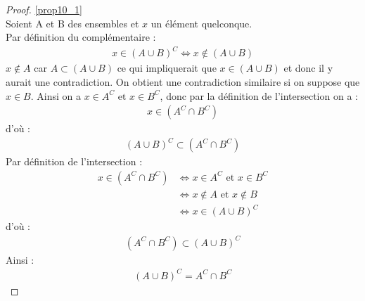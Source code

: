 \begin{proof}
	\ref{prop10_1} \\
	Soient A et B des ensembles et $x$ un élément quelconque.
	\\
	\framebox{$\subset$}
	Par définition du complémentaire : 
	\begin{align*}
		x \in (A \cup B)^C \iff x \notin (A \cup B)
	\end{align*}
	$x \notin A$ car $A \subset (A \cup B)$ ce qui impliquerait que $x \in (A \cup B)$ et donc il y aurait une contradiction. On obtient une contradiction similaire si on suppose que $x \in B$. Ainsi on a $x \in A^C \text{ et } x \in B^C$, donc par la définition de l'intersection on a :
	\begin{align*}
		x \in (A^C \cap B^C)
	\end{align*}
	d'où :
	\begin{align*}
		(A \cup B)^C \subset (A^C \cap B^C)
	\end{align*}
	\framebox{$\supset$} Par définition de l'intersection :
	\begin{align*}
		x \in (A^C \cap B^C) &\iff x \in A^C \text{ et } x \in B^C \\
		&\iff x \notin A \text{ et } x \notin B \\
		&\iff x \in (A \cup B)^C
	\end{align*}
	d'où :
	\begin{align*}
		(A^C \cap B^C) \subset (A \cup B)^C
	\end{align*}
	Ainsi : 
	\begin{align*}
		(A \cup B)^C = A^C \cap B^C
	\end{align*}
\end{proof}

